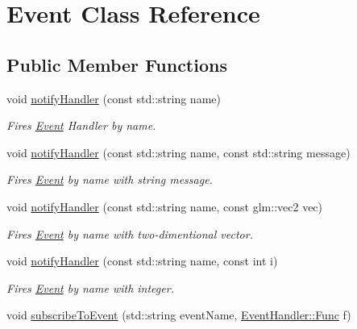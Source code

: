 \hypertarget{class_event}{\section{Event Class Reference}
\label{class_event}
}
\subsection*{Public Member Functions}
\begin{DoxyCompactItemize}
\item 
\hypertarget{class_event_a144119cf594d4a6f6c2bf77811f223e3}{void \hyperlink{class_event_a144119cf594d4a6f6c2bf77811f223e3}{notify\+Handler} (const std\+::string name)}\label{class_event_a144119cf594d4a6f6c2bf77811f223e3}

\begin{DoxyCompactList}\small\item\em Fires \hyperlink{class_event}{Event} Handler by name. \end{DoxyCompactList}\item 
\hypertarget{class_event_ad36b10d25df1e94f8a4f6c63087d2ee9}{void \hyperlink{class_event_ad36b10d25df1e94f8a4f6c63087d2ee9}{notify\+Handler} (const std\+::string name, const std\+::string message)}\label{class_event_ad36b10d25df1e94f8a4f6c63087d2ee9}

\begin{DoxyCompactList}\small\item\em Fires \hyperlink{class_event}{Event} by name with string message. \end{DoxyCompactList}\item 
\hypertarget{class_event_a907738a2574c1762bdd44fa282fe6af6}{void \hyperlink{class_event_a907738a2574c1762bdd44fa282fe6af6}{notify\+Handler} (const std\+::string name, const glm\+::vec2 vec)}\label{class_event_a907738a2574c1762bdd44fa282fe6af6}

\begin{DoxyCompactList}\small\item\em Fires \hyperlink{class_event}{Event} by name with two-\/dimentional vector. \end{DoxyCompactList}\item 
\hypertarget{class_event_a418ae9b1a1f59c0e3833f320c5d36e26}{void \hyperlink{class_event_a418ae9b1a1f59c0e3833f320c5d36e26}{notify\+Handler} (const std\+::string name, const int i)}\label{class_event_a418ae9b1a1f59c0e3833f320c5d36e26}

\begin{DoxyCompactList}\small\item\em Fires \hyperlink{class_event}{Event} by name with integer. \end{DoxyCompactList}\item 
\hypertarget{class_event_a9d441ecc394728ab055ef8f551abcc6f}{void \hyperlink{class_event_a9d441ecc394728ab055ef8f551abcc6f}{subscribe\+To\+Event} (std\+::string event\+Name, \hyperlink{class_event_handler_af1c003b45c76eb6eb0852801a997561b}{Event\+Handler\+::\+Func} f)}\label{class_event_a9d441ecc394728ab055ef8f551abcc6f}


\end{DoxyCompactItemize}
